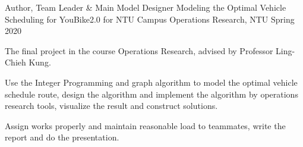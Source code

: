 

\begin{cventries}

  \cventry
    {Author, Team Leader \& Main Model Designer} %
    {Modeling the Optimal Vehicle Scheduling for YouBike2.0 for NTU Campus} %
    {Operations Research, NTU} %
    {Spring 2020} %
    {
      \begin{cvitems} %
        \item {The final project in the course Operations Research, advised by Professor Ling-Chieh Kung.}
        \item {Use the Integer Programming and graph algorithm to model the optimal vehicle schedule route, design the algorithm and implement the algorithm by operations research tools, visualize the result and construct solutions.}
        \item {Assign works properly and maintain reasonable load to teammates, write the report and do the presentation.}
      \end{cvitems}
    }


\end{cventries}
